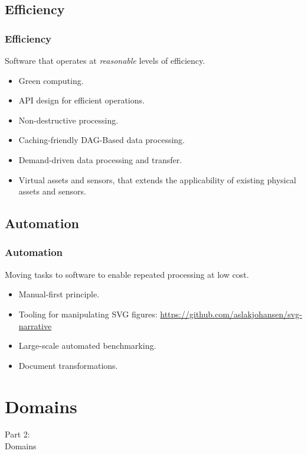 \subsection{Efficiency}
\begin{frame}
    \frametitle{Efficiency}
    \vspace{0mm}
    Software that operates at \textsl{reasonable} levels of efficiency.
    \vspace{3mm}
    \begin{itemize}
        \item Green computing.
        \item API design for efficient operations.
        \item Non-destructive processing.
        \item Caching-friendly DAG-Based data processing.
        \item Demand-driven data processing and transfer.
        \item Virtual assets and sensors, that extends the applicability of existing physical assets and sensors.
    \end{itemize}
\end{frame}

\subsection{Automation}
\begin{frame}
    \frametitle{Automation}
    \vspace{0mm}
    Moving tasks to software to enable repeated processing at low cost.
    \vspace{3mm}
    \begin{itemize}
        \item Manual-first principle.
        \item Tooling for manipulating SVG figures:
          \url{https://github.com/aslakjohansen/svg-narrative}
        \item Large-scale automated benchmarking.
        \item Document transformations.
    \end{itemize}
\end{frame}

\section{Domains}
\begin{frame}
    \vspace{25mm}
    \begin{center}
        \Huge{Part 2:\\Domains}
    \end{center}
\end{frame}

